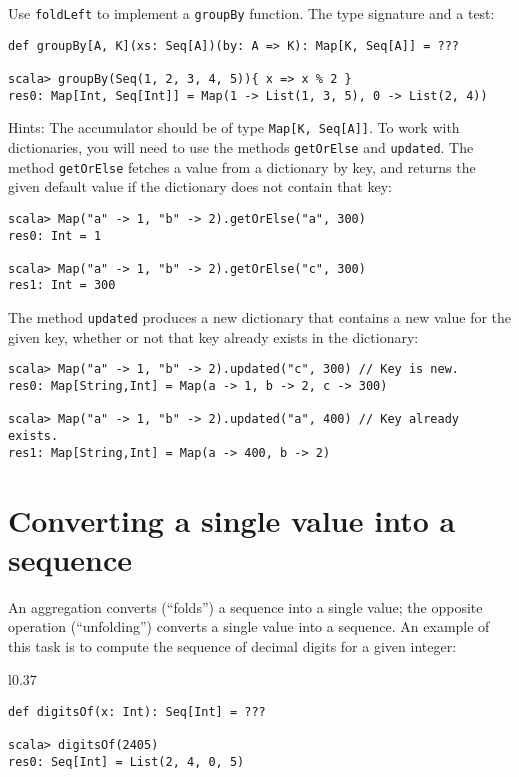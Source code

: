 Use \lstinline!foldLeft! to implement a \lstinline!groupBy! function.
The type signature and a test:
\begin{lstlisting}
def groupBy[A, K](xs: Seq[A])(by: A => K): Map[K, Seq[A]] = ???

scala> groupBy(Seq(1, 2, 3, 4, 5)){ x => x % 2 }
res0: Map[Int, Seq[Int]] = Map(1 -> List(1, 3, 5), 0 -> List(2, 4))
\end{lstlisting}

Hints: The accumulator should be of type \lstinline!Map[K, Seq[A]]!.
To work with dictionaries, you will need to use the methods \lstinline!getOrElse!
and \lstinline!updated!. The method \lstinline!getOrElse! fetches
a value from a dictionary by key, and returns the given default value
if the dictionary does not contain that key:
\begin{lstlisting}
scala> Map("a" -> 1, "b" -> 2).getOrElse("a", 300)
res0: Int = 1

scala> Map("a" -> 1, "b" -> 2).getOrElse("c", 300)
res1: Int = 300
\end{lstlisting}
The method \lstinline!updated! produces a new dictionary that contains
a new value for the given key, whether or not that key already exists
in the dictionary:
\begin{lstlisting}
scala> Map("a" -> 1, "b" -> 2).updated("c", 300) // Key is new.
res0: Map[String,Int] = Map(a -> 1, b -> 2, c -> 300)

scala> Map("a" -> 1, "b" -> 2).updated("a", 400) // Key already exists.
res1: Map[String,Int] = Map(a -> 400, b -> 2) 
\end{lstlisting}


\section{Converting a single value into a sequence\label{sec:ch2Converting-a-single}}

An aggregation converts (\textsf{``}folds\textsf{''}) a sequence into a single value;
the opposite operation (\textsf{``}unfolding\textsf{''}) converts a single value into
a sequence. An example of this task is to compute the sequence of
decimal digits for a given integer:

\begin{wrapfigure}{l}{0.37\columnwidth}%
\vspace{-1\baselineskip}
\begin{lstlisting}
def digitsOf(x: Int): Seq[Int] = ???

scala> digitsOf(2405)
res0: Seq[Int] = List(2, 4, 0, 5)
\end{lstlisting}

\vspace{-1.5\baselineskip}
\end{wrapfigure}%

